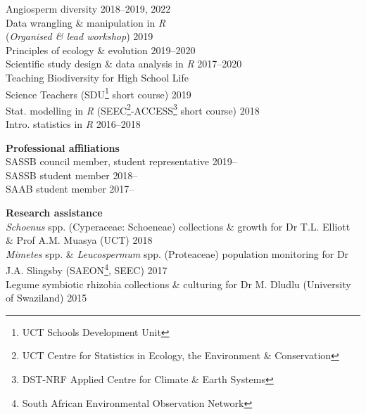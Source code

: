 \documentclass[10pt]{article}
\begin{document}
\begin{multicols}{2}
Angiosperm diversity                         \hfill {\small 2018--2019, 2022} \\
Data wrangling \& manipulation in \textit{R} \\
\hspace{2em} (\textit{Organised \& lead workshop}) \hfill {\small       2019} \\
Principles of ecology \& evolution                 \hfill {\small 2019--2020} \\
Scientific study design \& data analysis in \textit{R}
                                                   \hfill {\small 2017--2020} \\
Teaching Biodiversity for High School Life \\
\hspace{2em} Science Teachers {\small (SDU\footnote{UCT Schools Development
  Unit} short course)}                             \hfill {\small       2019} \\
Stat. modelling in \textit{R} {\small (SEEC\footnote{UCT Centre for
  Statistics in Ecology, the Environment \& Conservation}-ACCESS\footnote{
  DST-NRF Applied Centre for Climate \& Earth Systems} short course)}
                                                   \hfill {\small       2018} \\
Intro. statistics in \textit{R}                    \hfill {\small 2016--2018}

\textbf{Professional affiliations}\\ %

SASSB council member, student representative           \hfill {\small 2019--} \\
SASSB student member                                   \hfill {\small 2018--} \\
SAAB student member                                    \hfill {\small 2017--}

\end{multicols}

\textbf{Research assistance}\\ %

\textit{Schoenus} spp. (Cyperaceae: Schoeneae) collections \& growth for Dr
  T.L. Elliott \& Prof A.M. Muasya {\small (UCT)}        \hfill {\small 2018} \\
\textit{Mimetes} spp. \& \textit{Leucospermum} spp. (Proteaceae) population
  monitoring for Dr J.A. Slingsby {\small (SAEON\footnote{South African
  Environmental Observation Network}, SEEC)}             \hfill {\small 2017} \\
Legume symbiotic rhizobia collections \& culturing for Dr M. Dludlu
  {\small (University of Swaziland)}                     \hfill {\small 2015}
\end{document}
